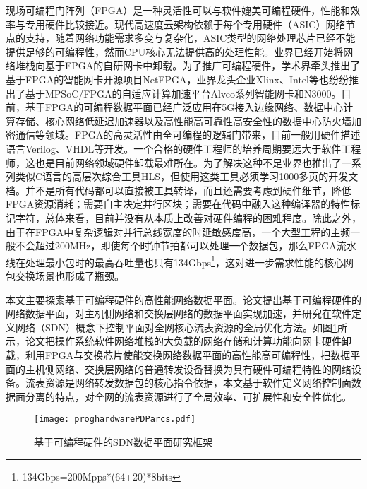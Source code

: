 现场可编程门阵列（FPGA）是一种灵活性可以与软件媲美可编程硬件，性能和效率与专用硬件比较接近。现代高速度云架构依赖于每个专用硬件（ASIC）网络节点的支持，随着网络功能需求多变与复杂化，ASIC类型的网络处理芯片已经不能提供足够的可编程性，然而CPU核心无法提供高的处理性能。业界已经开始将网络堆栈向基于FPGA的自研网卡中卸载。为了推广可编程硬件，学术界牵头推出了基于FPGA的智能网卡开源项目NetFPGA，业界龙头企业Xlinx、Intel等也纷纷推出了基于MPSoC/FPGA的自适应计算加速平台Alveo系列智能网卡和N3000。目前，基于FPGA的可编程数据平面已经广泛应用在5G接入边缘网络、数据中心计算存储、核心网络低延迟加速器以及高性能高可靠性高安全性的数据中心防火墙加密通信等领域。FPGA的高灵活性由全可编程的逻辑门带来，目前一般用硬件描述语言Verilog、VHDL等开发。一个合格的硬件工程师的培养周期要远大于软件工程师，这也是目前网络领域硬件卸载最难所在。为了解决这种不足业界也推出了一系列类似C语言的高层次综合工具HLS，但使用这类工具必须学习1000多页的开发文档。并不是所有代码都可以直接被工具转译，而且还需要考虑到硬件细节，降低FPGA资源消耗；需要自主决定并行区块；需要在代码中融入这种编译器的特性标记字符，总体来看，目前并没有从本质上改善对硬件编程的困难程度。除此之外，由于在FPGA中复杂逻辑对并行总线宽度的时延敏感度高，一个大型工程的主频一般不会超过200MHz，即使每个时钟节拍都可以处理一个数据包，那么FPGA流水线在处理最小包时的最高吞吐量也只有134Gbps\footnote{134Gbps=200Mpps*(64+20)*8bits}，这对进一步需求性能的核心网包交换场景也形成了瓶颈。


本文主要探索基于可编程硬件的高性能网络数据平面。论文提出基于可编程硬件的网络数据平面，对主机侧网络和交换层网络的数据平面实现加速，并研究在软件定义网络（SDN）概念下控制平面对全网核心流表资源的全局优化方法。如图\ref{proghardwarePDParcs}所示，论文把操作系统软件网络堆栈的大负载的网络存储和计算功能向网卡硬件卸载，利用FPGA与交换芯片使能交换网络数据平面的高性能高可编程性，把数据平面的主机侧网络、交换层网络的普通转发设备替换为具有硬件可编程特性的网络设备。流表资源是网络转发数据包的核心指令依据，本文基于软件定义网络控制面数据面分离的特点，对全网的流表资源进行了全局效率、可扩展性和安全性优化。

\begin{figure}[!ht]
	\centering
	\texttt{[image: proghardwarePDParcs.pdf]}
	\caption{基于可编程硬件的SDN数据平面研究框架} \label{proghardwarePDParcs}
\end{figure}

